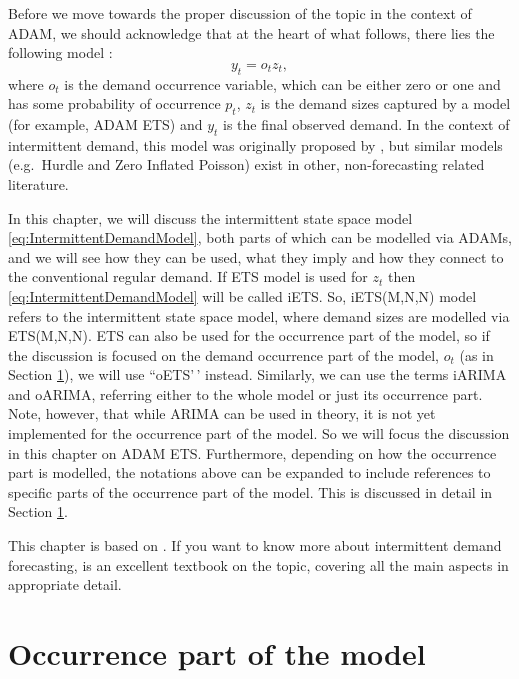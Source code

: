 \documentclass[
]{book}
\theoremstyle{definition}
\theoremstyle{definition}
\theoremstyle{definition}
\theoremstyle{definition}
\theoremstyle{remark}
\begin{document}
Before we move towards the proper discussion of the topic in the context of ADAM, we should acknowledge that at the heart of what follows, there lies the following model \citep{Croston1972}:
\begin{equation}
y_t = o_t z_t ,
\label{eq:IntermittentDemandModel}
\end{equation}
where \(o_t\) is the demand occurrence variable, which can be either zero or one and has some probability of occurrence \(p_t\), \(z_t\) is the demand sizes captured by a model (for example, ADAM ETS) and \(y_t\) is the final observed demand. In the context of intermittent demand, this model was originally proposed by \citet{Croston1972}, but similar models (e.g.~Hurdle and Zero Inflated Poisson) exist in other, non-forecasting related literature.

In this chapter, we will discuss the intermittent state space model \eqref{eq:IntermittentDemandModel}, both parts of which can be modelled via ADAMs, and we will see how they can be used, what they imply and how they connect to the conventional regular demand. If ETS model is used for \(z_t\) then \eqref{eq:IntermittentDemandModel} will be called iETS. So, iETS(M,N,N) model refers to the intermittent state space model, where demand sizes are modelled via ETS(M,N,N). ETS can also be used for the occurrence part of the model, so if the discussion is focused on the demand occurrence part of the model, \(o_t\) (as in Section \ref{ADAMOccurrence}), we will use ``oETS'\,' instead. Similarly, we can use the terms iARIMA and oARIMA, referring either to the whole model or just its occurrence part. Note, however, that while ARIMA can be used in theory, it is not yet implemented for the occurrence part of the model. So we will focus the discussion in this chapter on ADAM ETS. Furthermore, depending on how the occurrence part is modelled, the notations above can be expanded to include references to specific parts of the occurrence part of the model. This is discussed in detail in Section \ref{ADAMOccurrence}.

This chapter is based on \citet{Svetunkov2019a}. If you want to know more about intermittent demand forecasting, \citet{BoylanSyntetos2021} is an excellent textbook on the topic, covering all the main aspects in appropriate detail.

\hypertarget{ADAMOccurrence}{%
\section{Occurrence part of the model}\label{ADAMOccurrence}}
\end{document}
